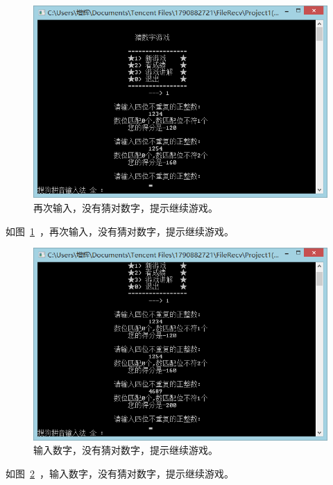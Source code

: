 \begin{figure}[htp]
\includegraphics[width=\textwidth]{image/23.png}
\caption{\label{p3}再次输入，没有猜对数字，提示继续游戏。}
\end{figure}

如图~\ref{p3}~，再次输入，没有猜对数字，提示继续游戏。

\begin{figure}[htp]
\includegraphics[width=\textwidth]{image/24.png}
\caption{\label{p4}输入数字，没有猜对数字，提示继续游戏。}
\end{figure}
 
如图~\ref{p4}~，输入数字，没有猜对数字，提示继续游戏。

